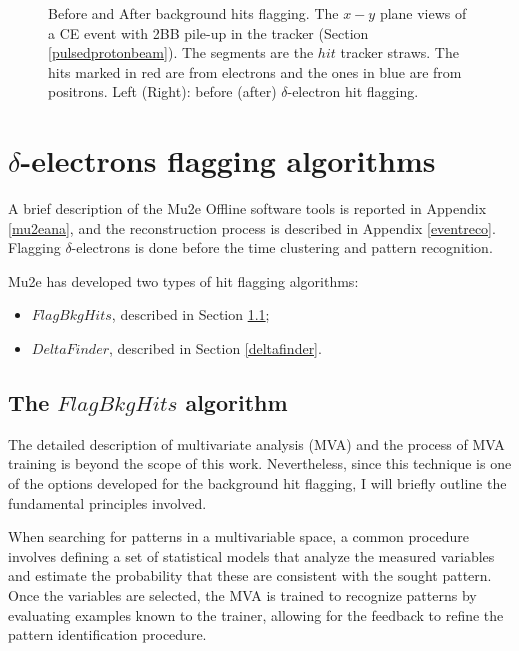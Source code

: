 \begin{figure}[!h]
\begin{subfigure}[b]{0.7\linewidth}
        \label{fig:af}
    \end{subfigure}
    \caption[Before and After background hits flagging.]{
        Before and After background hits flagging. 
        The $x-y$ plane views of a CE 
    event with 2BB pile-up in the tracker (Section \ref{pulsedprotonbeam}). 
    The segments are the $hit$ tracker straws. 
    The hits marked in
    red are from electrons and the ones in 
    blue are from positrons. Left (Right): before (after) $\delta$-electron hit flagging.}
    \label{fig:afbef} 
\end{figure}






\section{$\delta$-electrons flagging algorithms}
A brief description of the Mu2e Offline software tools  
is reported in Appendix \ref{mu2eana}, and the reconstruction 
process is described in Appendix \ref{eventreco}. 
Flagging $\delta$-electrons is done before the time clustering 
and pattern recognition.

Mu2e has developed two types of hit flagging algorithms:
\begin{itemize}
    \item $FlagBkgHits$, described in Section \ref{flagbkghits};
    \item $DeltaFinder$, described in Section \ref{deltafinder}.
\end{itemize}

\subsection{The $FlagBkgHits$ algorithm}\label{flagbkghits}
The detailed description of multivariate 
analysis (MVA) and the 
process of MVA training is beyond the 
scope of this work. 
Nevertheless, since this technique is 
one of the options 
developed for the background hit flagging, I 
will briefly outline 
the fundamental principles involved.

When searching for patterns in a multivariable space, 
a common procedure involves 
defining a set of statistical 
models that analyze the measured 
variables and estimate 
the probability that these are consistent with the 
sought pattern. Once the variables are selected, 
the MVA is trained to recognize patterns by 
evaluating examples known to the trainer, 
allowing for the feedback to refine the 
pattern identification procedure.

